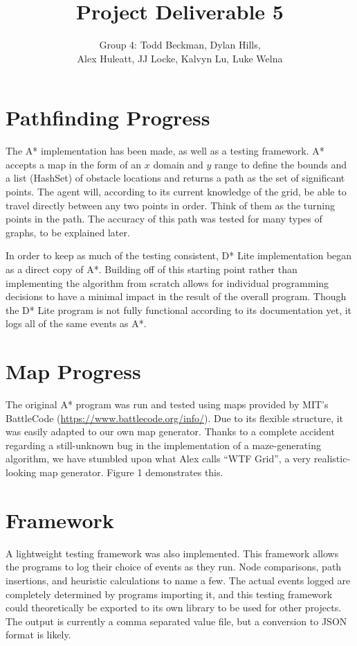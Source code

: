 \documentclass{article}
\begin{document}
\title{Project Deliverable 5}
\author{Group 4: Todd Beckman, Dylan Hills, \\
    Alex Huleatt, JJ Locke, Kalvyn Lu, Luke Welna}
\date{}
\maketitle

\section{Pathfinding Progress}

The A* implementation has been made, as well as a testing framework. A* 
accepts a map in the form of an $x$ domain and $y$ range to define the bounds
and a list (HashSet) of obstacle locations and returns a path as the set of
significant points. The agent will, according to its current knowledge of the
grid, be able to travel directly between any two points in order. Think of them
as the turning points in the path. The accuracy of this path was tested for
many types of graphs, to be explained later.

In order to keep as much of the testing consistent, D* Lite implementation
began as a direct copy of A*. Building off of this starting point rather than
implementing the algorithm from scratch allows for individual programming
decisions to have a minimal impact in the result of the overall program. Though
the D* Lite program is not fully functional according to its documentation yet,
it logs all of the same events as A*.

\section{Map Progress}

The original A* program was run and tested using maps provided by MIT's
BattleCode (\url{https://www.battlecode.org/info/}). Due to its flexible structure, 
it was easily adapted to our own map generator. Thanks to a complete accident 
regarding a still-unknown bug in the implementation of a maze-generating algorithm, 
we have stumbled upon what Alex calls ``WTF Grid'', a very realistic-looking map generator.
Figure 1 demonstrates this.

\section{Framework}

A lightweight testing framework was also implemented. This framework allows
the programs to log their choice of events as they run. Node comparisons,
path insertions, and heuristic calculations to name a few. The actual
events logged are completely determined by programs importing it, and this
testing framework could theoretically be exported to its own library to be
used for other projects. The output is currently a comma separated value
file, but a conversion to JSON format is likely.
\end{document}
